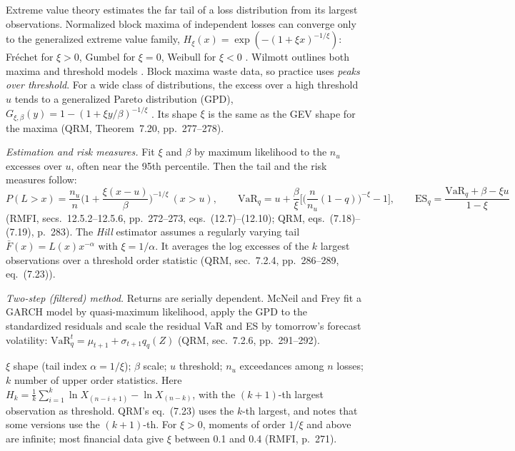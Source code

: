 \begin{qfmethod}\label{meth:extreme-value-tail-estimation}
 Extreme value theory estimates the far tail of a loss distribution from its largest observations. Normalized block maxima of independent losses can converge only to the generalized extreme value family, $H_\xi(x)=\exp(-(1+\xi x)^{-1/\xi})$: Fr\'echet for $\xi>0$, Gumbel for $\xi=0$, Weibull for $\xi<0$ \citep[chap.~7, sec.~7.1.1, pp.~265--266]{mcneil-frey-embrechts-qrm-2005}. Wilmott outlines both maxima and threshold models \citep[chap.~19, sec.~19.8.1, p.~341]{wide-wilmott-pwoqf}. Block maxima waste data, so practice uses \emph{peaks over threshold}. For a wide class of distributions, the excess over a high threshold $u$ tends to a generalized Pareto distribution (GPD), $G_{\xi,\beta}(y)=1-(1+\xi y/\beta)^{-1/\xi}$ \citep[chap.~12, sec.~12.5.1, p.~271]{risk-management-financial-institutions-2023}. Its shape $\xi$ is the same as the GEV shape for the maxima (QRM, Theorem~7.20, pp.~277--278).

\emph{Estimation and risk measures.} Fit $\xi$ and $\beta$ by maximum likelihood to the $n_u$ excesses over $u$, often near the 95th percentile. Then the tail and the risk measures follow:
\[ P(L>x)=\frac{n_u}{n}\Big(1+\frac{\xi(x-u)}\beta\Big)^{-1/\xi}\ (x>u),\qquad \mathrm{VaR}_q=u+\frac\beta\xi\Big[\Big(\frac{n}{n_u}(1-q)\Big)^{-\xi}-1\Big],\qquad \mathrm{ES}_q=\frac{\mathrm{VaR}_q+\beta-\xi u}{1-\xi} \]
(RMFI, secs.~12.5.2--12.5.6, pp.~272--273, eqs.~(12.7)--(12.10); QRM, eqs.~(7.18)--(7.19), p.~283). The \emph{Hill} estimator assumes a regularly varying tail $\bar F(x)=L(x)x^{-\alpha}$ with $\xi=1/\alpha$. It averages the log excesses of the $k$ largest observations over a threshold order statistic (QRM, sec.~7.2.4, pp.~286--289, eq.~(7.23)).

\emph{Two-step (filtered) method.} Returns are serially dependent. McNeil and Frey fit a GARCH model by quasi-maximum likelihood, apply the GPD to the standardized residuals and scale the residual VaR and ES by tomorrow's forecast volatility: $\mathrm{VaR}^t_q=\mu_{t+1}+\sigma_{t+1}q_q(Z)$ (QRM, sec.~7.2.6, pp.~291--292).

 $\xi$ shape (tail index $\alpha=1/\xi$); $\beta$ scale; $u$ threshold; $n_u$ exceedances among $n$ losses; $k$ number of upper order statistics. Here $H_k=\tfrac1k\sum_{i=1}^k\ln X_{(n-i+1)}-\ln X_{(n-k)}$, with the $(k+1)$-th largest observation as threshold. QRM's eq.~(7.23) uses the $k$-th largest, and notes that some versions use the $(k+1)$-th. For $\xi>0$, moments of order $1/\xi$ and above are infinite; most financial data give $\xi$ between 0.1 and 0.4 (RMFI, p.~271).


\end{qfmethod}
